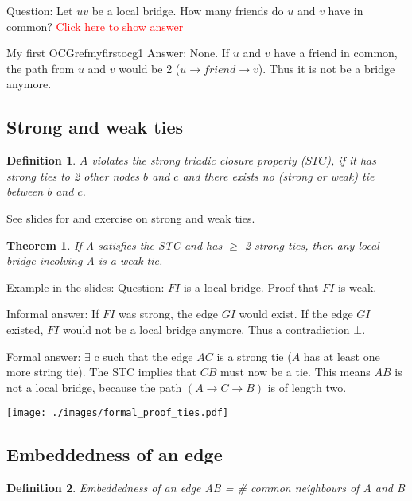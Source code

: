 \documentclass[12pt]{scrartcl}
\newtheorem{defi}{Definition}
\newtheorem{theo}{Theorem}
\begin{document}
\noindent Question: Let $uv$ be a local bridge. How many friends do $u$ and $v$ have in common?
%
{\textcolor{red}{Click here to show answer}}

\begin{ocg}{My first OCG}{refmyfirstocg}{1}
\noindent Answer: None. If $u$ and $v$ have a friend in common, the path from $u$ and $v$ would be 2 ($u \rightarrow friend  \rightarrow v$). Thus it is not be a bridge anymore. 
\end{ocg}

\subsection{Strong and weak ties}
\begin{defi}
	$A$ violates the strong triadic closure property ($STC$), if it has strong ties to 2 other nodes $b$ and $c$ and there exists no (strong or weak) tie between $b$ and $c$.
\end{defi}

\noindent See slides for and exercise on strong and weak ties.

\begin{theo}
	If A satisfies the STC and has $\geq$ 2 strong ties, then any local bridge incolving A is a weak tie.
\end{theo}

\noindent Example in the slides:
Question: $FI$ is a local bridge. Proof that $FI$ is weak. \newline

Informal answer: If $FI$ was strong, the edge $GI$ would exist. If the edge $GI$ existed, $FI$ would not be a local bridge anymore. Thus a contradiction $\bot$.

\begin{minipage}{0.5\textwidth}
	Formal answer: $\exists$ c such that the edge $AC$ is a strong tie ($A$ has at least one more string tie). The STC implies that $CB$ must now be a tie. This means $AB$ is not a local bridge, because the path $(A \rightarrow C \rightarrow B)$ is of length two.
\end{minipage} \hfill
\begin{minipage}{0.3\textwidth}	
	\texttt{[image: ./images/formal\_proof\_ties.pdf]}
    \label{fig:formal_proof_ties}
\end{minipage}


\subsection{Embeddedness of an edge}
\begin{defi}
	Embeddedness of an edge AB = \# common neighbours of A and B
\end{defi}
\end{document}

